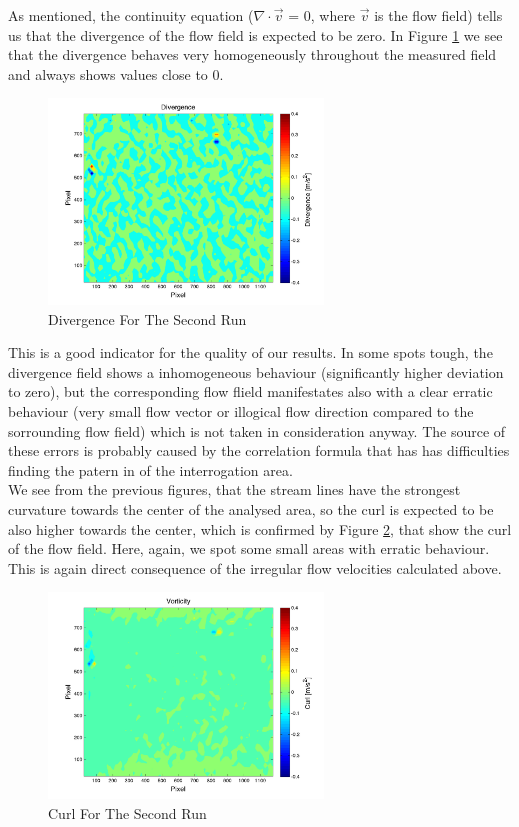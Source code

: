 As mentioned, the continuity equation ($\nabla \cdot \vec  v$ = 0, where $\vec v$ is the flow field) tells us that the divergence of the flow field is expected to be zero. In Figure \ref{pic:4r2} we see that the divergence behaves very homogeneously throughout the measured field and always shows values close to 0. 

\begin{figure}[H]
\centering
\includegraphics[width=0.65\textwidth]{pics/figure4_run2.png}
\caption{Divergence For The Second Run}
\label{pic:4r2}
\end{figure}

This is a good indicator for the quality of our results. In some spots tough, the divergence field shows a inhomogeneous behaviour (significantly higher deviation to zero), but the corresponding flow flield manifestates also with a clear erratic behaviour (very small flow vector or illogical flow direction compared to the sorrounding flow field) which is not taken in consideration anyway. The source of these errors is probably caused by the correlation formula that has has difficulties finding the patern in of the interrogation area.\\

We see from the previous figures, that the stream lines have the strongest curvature towards the center of the analysed area, so the curl is expected to be also higher towards the center, which is confirmed by Figure \ref{pic:5r2}, that show the curl of the flow field. Here, again, we spot some small areas with erratic behaviour. This is again direct consequence of the irregular flow velocities calculated above.




\begin{figure}[H]
\centering
\includegraphics[width=0.65\textwidth]{pics/figure5_run2.png}
\caption{Curl For The Second Run}
\label{pic:5r2}
\end{figure}






